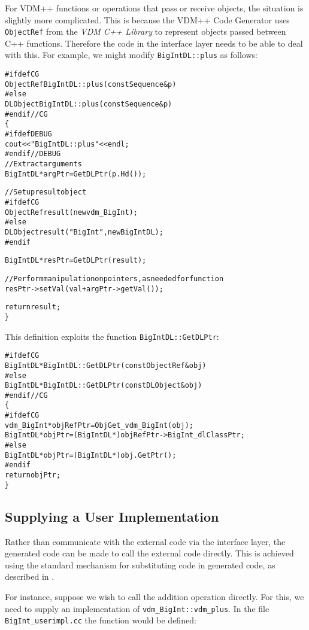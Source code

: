 \documentclass[\pformat,12pt]{article}
\newcommand{\vdmcpplib}{\textit{VDM C++ Library}}
\begin{document}
For VDM++ functions or operations that pass or receive objects, the
situation is slightly more complicated. This is because the VDM++ Code
Generator uses \texttt{ObjectRef} from the {\vdmcpplib} to represent
objects passed between C++ functions. Therefore the code in the
interface layer needs to be able to deal with this. For example, we 
might modify \texttt{BigIntDL::plus} as follows:
\begin{alltt}
\#ifdef CG
ObjectRef BigIntDL::plus (const Sequence &p)
\#else
DLObject BigIntDL::plus (const Sequence &p)
\#endif //CG
\{
\#ifdef DEBUG
  cout << "BigIntDL::plus" << endl;
\#endif //DEBUG
  // Extract arguments
  BigIntDL *argPtr = GetDLPtr(p.Hd());

  // Set up result object
\#ifdef CG
  ObjectRef result (new vdm_BigInt);
\#else
  DLObject result("BigInt", new BigIntDL);
\#endif 

  BigIntDL *resPtr = GetDLPtr(result);

  // Perform manipulation on pointers, as needed for function
  resPtr->setVal( val + argPtr->getVal());

  return result;
\}
\end{alltt}
This definition exploits the function \texttt{BigIntDL::GetDLPtr}:
\begin{alltt}
\#ifdef CG
BigIntDL *BigIntDL::GetDLPtr(const ObjectRef& obj)
\#else
BigIntDL *BigIntDL::GetDLPtr(const DLObject& obj)
\#endif //CG
\{
\#ifdef CG
  vdm_BigInt *objRefPtr = ObjGet_vdm_BigInt(obj);
  BigIntDL *objPtr = (BigIntDL*) objRefPtr->BigInt_dlClassPtr;
\#else
  BigIntDL *objPtr = (BigIntDL*) obj.GetPtr(); 
\#endif
  return objPtr;
\}
\end{alltt}

\subsection{Supplying a User Implementation}

Rather than communicate with the external code via the interface
layer, the generated code can be made to call the external code
directly. This is achieved using the standard mechanism for
substituting code in generated code, as described in \cite{CGManPP-CSK}. 

For instance, suppose we wish to call the addition
operation  directly. For this, we need to supply an implementation of
\texttt{vdm\_BigInt::vdm\_plus}. In the file
\texttt{BigInt\_userimpl.cc} the function would be defined:
\end{document}
